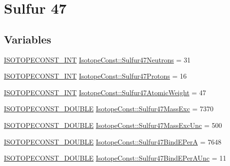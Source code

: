 \hypertarget{group___isotope_const-_sulfur-_s47}{}\section{Sulfur 47}
\label{group___isotope_const-_sulfur-_s47}
\subsection*{Variables}
\begin{DoxyCompactItemize}
\item 
\mbox{\hyperlink{group___isotope_const-_macros_ga5f18360b3e99483a35c32d789e62621c}{I\+S\+O\+T\+O\+P\+E\+C\+O\+N\+S\+T\+\_\+\+I\+NT}} \mbox{\hyperlink{group___isotope_const-_sulfur-_s47_gaabfae55663682b4349241cc9c795be04}{Isotope\+Const\+::\+Sulfur47\+Neutrons}} = 31
\item 
\mbox{\hyperlink{group___isotope_const-_macros_ga5f18360b3e99483a35c32d789e62621c}{I\+S\+O\+T\+O\+P\+E\+C\+O\+N\+S\+T\+\_\+\+I\+NT}} \mbox{\hyperlink{group___isotope_const-_sulfur-_s47_ga4ed39c9d0bab4067752b54bf460d96b3}{Isotope\+Const\+::\+Sulfur47\+Protons}} = 16
\item 
\mbox{\hyperlink{group___isotope_const-_macros_ga5f18360b3e99483a35c32d789e62621c}{I\+S\+O\+T\+O\+P\+E\+C\+O\+N\+S\+T\+\_\+\+I\+NT}} \mbox{\hyperlink{group___isotope_const-_sulfur-_s47_ga34619f0bb42a39be69a0db40ce675fcf}{Isotope\+Const\+::\+Sulfur47\+Atomic\+Weight}} = 47
\item 
\mbox{\hyperlink{group___isotope_const-_macros_ga8f45a7272ce02c0b4c65c44636ed719a}{I\+S\+O\+T\+O\+P\+E\+C\+O\+N\+S\+T\+\_\+\+D\+O\+U\+B\+LE}} \mbox{\hyperlink{group___isotope_const-_sulfur-_s47_gadad425a573452bc3ed03f84164b97eb2}{Isotope\+Const\+::\+Sulfur47\+Mass\+Exc}} = 7370
\item 
\mbox{\hyperlink{group___isotope_const-_macros_ga8f45a7272ce02c0b4c65c44636ed719a}{I\+S\+O\+T\+O\+P\+E\+C\+O\+N\+S\+T\+\_\+\+D\+O\+U\+B\+LE}} \mbox{\hyperlink{group___isotope_const-_sulfur-_s47_ga95b8efd65438e9654994cca6ef793183}{Isotope\+Const\+::\+Sulfur47\+Mass\+Exc\+Unc}} = 500
\item 
\mbox{\hyperlink{group___isotope_const-_macros_ga8f45a7272ce02c0b4c65c44636ed719a}{I\+S\+O\+T\+O\+P\+E\+C\+O\+N\+S\+T\+\_\+\+D\+O\+U\+B\+LE}} \mbox{\hyperlink{group___isotope_const-_sulfur-_s47_gad97ba99a541bd4d272291942c38d2fa4}{Isotope\+Const\+::\+Sulfur47\+Bind\+E\+PerA}} = 7648
\item 
\mbox{\hyperlink{group___isotope_const-_macros_ga8f45a7272ce02c0b4c65c44636ed719a}{I\+S\+O\+T\+O\+P\+E\+C\+O\+N\+S\+T\+\_\+\+D\+O\+U\+B\+LE}} \mbox{\hyperlink{group___isotope_const-_sulfur-_s47_ga12e1e715ddb2aa0112dd3c4e37c50627}{Isotope\+Const\+::\+Sulfur47\+Bind\+E\+Per\+A\+Unc}} = 11

\end{DoxyCompactItemize}
